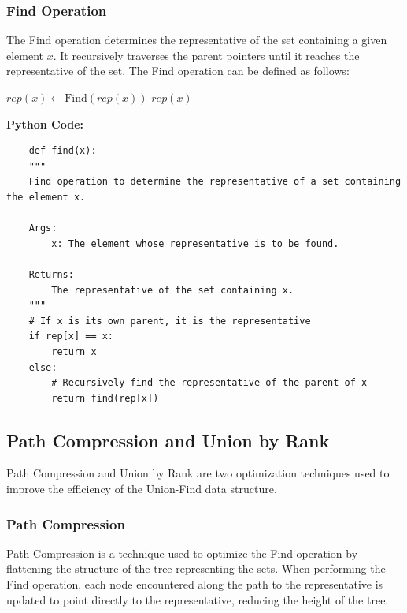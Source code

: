 \documentclass[12pt]{book} %
\begin{document}
\subsubsection{Find Operation}

The Find operation determines the representative of the set containing a given element \(x\). It recursively traverses the parent pointers until it reaches the representative of the set. The Find operation can be defined as follows:
\FloatBarrier
\begin{algorithm}[H]
\caption{Find(\(x\))}
\begin{algorithmic}[1]
        \State \(rep(x) \gets \text{Find}(rep(x))\)
    \EndIf
    \State \Return \(rep(x)\)
\EndFunction
\end{algorithmic}
\end{algorithm}
\FloatBarrier
\textbf{Python Code:}
\FloatBarrier
\begin{lstlisting}
    def find(x):
    """
    Find operation to determine the representative of a set containing the element x.
    
    Args:
        x: The element whose representative is to be found.
    
    Returns:
        The representative of the set containing x.
    """
    # If x is its own parent, it is the representative
    if rep[x] == x:
        return x
    else:
        # Recursively find the representative of the parent of x
        return find(rep[x])
\end{lstlisting}
\subsection{Path Compression and Union by Rank}

Path Compression and Union by Rank are two optimization techniques used to improve the efficiency of the Union-Find data structure.

\subsubsection{Path Compression}

Path Compression is a technique used to optimize the Find operation by flattening the structure of the tree representing the sets. When performing the Find operation, each node encountered along the path to the representative is updated to point directly to the representative, reducing the height of the tree.
\end{document}
